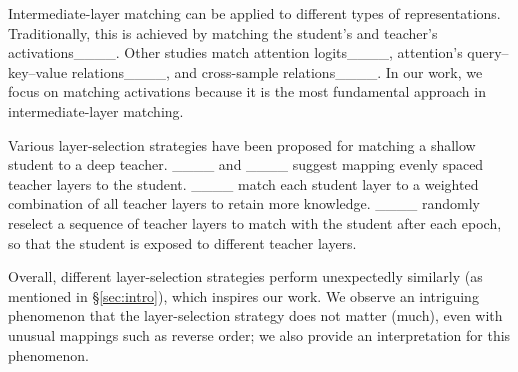 Intermediate-layer matching can be applied to different types of representations.  Traditionally, this is achieved by matching the student's and teacher's activations____. Other studies match attention logits____, attention's query--key--value relations____, and cross-sample relations____. In our work, we focus on matching activations because it is the most fundamental approach in intermediate-layer matching. 

Various layer-selection strategies have been proposed for matching a shallow student to a deep teacher. ____ and ____ suggest mapping evenly spaced teacher layers to the student. ____ match each student layer to
 a weighted combination of all teacher layers to retain more knowledge. ____ randomly reselect a sequence of teacher layers to match with the student after each epoch, so that the student is exposed to different teacher layers.

Overall, different layer-selection strategies perform unexpectedly similarly (as mentioned in \S\ref{sec:intro}), which inspires our work. We observe an intriguing phenomenon that the layer-selection strategy does not matter (much), even with unusual mappings such as reverse order; we also provide an interpretation for this phenomenon. 

